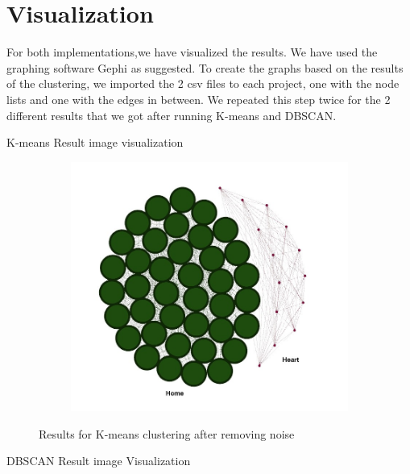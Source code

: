 \documentclass{article}
\begin{document}
\section{Visualization}
        
For both implementations,we have visualized the results. We have used the graphing software Gephi as suggested.
To create the graphs based on the results of the clustering, we imported the 2 csv files to each project, one with the node lists and one with the edges in between. 
We repeated this step twice for the 2 different results that we got after running 
K-means and DBSCAN.

K-means Result image visualization

\begin{figure}[H]
    \begin{subfigure} {1\textwidth}  
        \centering 
        \includegraphics[width=0.8\linewidth]{./img/kmeans.jpeg}
    \end{subfigure}    
    \caption{Results for K-means clustering after removing noise}
    \label{fig:movement}
\end{figure}

DBSCAN Result image Visualization
\end{document}
